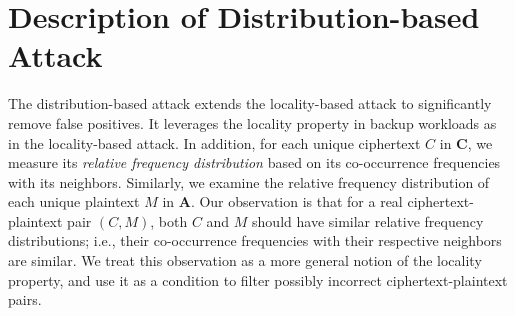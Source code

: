 \documentclass[bachelor]{thesis-uestc}
\begin{document}


\section{Description of Distribution-based Attack}
\label{sec:distribution-attack-description}

The distribution-based attack extends the locality-based attack \cite{li17} to
significantly remove false positives.  It leverages the locality property in
backup workloads as in the locality-based attack.  In addition, for each
unique ciphertext $C$ in $\mathbf{C}$, we measure its {\em relative frequency
distribution} based on its co-occurrence frequencies with its neighbors.
Similarly, we examine the relative frequency distribution of each unique
plaintext $M$ in $\mathbf{A}$.  Our observation is that for a real
ciphertext-plaintext pair $(C, M)$, both $C$ and $M$ should have similar
relative frequency distributions; i.e., their co-occurrence frequencies with
their respective neighbors are similar.  We treat this observation as a more
general notion of the locality property, and use it as a condition to filter
possibly incorrect ciphertext-plaintext pairs. 
\end{document}
